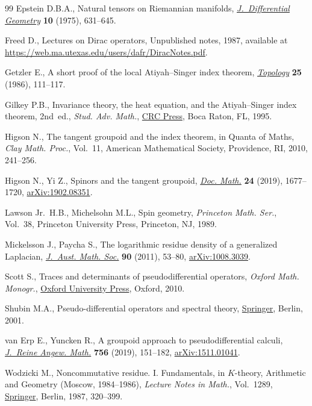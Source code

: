 \documentclass[pdftex]{sigma}
\numberwithin{equation}{section}
\theoremstyle{definition}
\begin{document}
\begin{thebibliography}{99}
Epstein D.B.A., Natural tensors on {R}iemannian manifolds,
 \href{https://doi.org/10.4310/jdg/1214433166}{\textit{J.~Differential Geometry}} \textbf{10} (1975), 631--645.

Freed D., Lectures on Dirac operators, {U}npublished notes, 1987, available at
 \url{https://web.ma.utexas.edu/users/dafr/DiracNotes.pdf}.

Getzler E., A short proof of the local {A}tiyah--{S}inger index theorem,
 \href{https://doi.org/10.1016/0040-9383(86)90008-X}{\textit{Topology}} \textbf{25} (1986), 111--117.

Gilkey P.B., Invariance theory, the heat equation, and the {A}tiyah--{S}inger
 index theorem, 2nd~ed., \textit{Stud. Adv. Math.}, \href{https://doi.org/10.1201/9780203749791}{CRC Press}, Boca Raton, FL, 1995.

Higson N., The tangent groupoid and the index theorem, in Quanta of Maths,
 \textit{Clay Math. Proc.}, Vol.~11, American Mathematical Society,
 Providence, RI, 2010, 241--256.

Higson N., Yi Z., Spinors and the tangent groupoid, \href{https://doi.org/10.4171/DM/712}{\textit{Doc. Math.}}
 \textbf{24} (2019), 1677--1720, \href{https://arxiv.org/abs/1902.08351}{arXiv:1902.08351}.

Lawson Jr.~H.B., Michelsohn M.L., Spin geometry, \textit{Princeton Math. Ser.},
 Vol.~38, Princeton University Press, Princeton, NJ, 1989.

Mickelsson J., Paycha S., The logarithmic residue density of a generalized
 {L}aplacian, \href{https://doi.org/10.1017/S144678871100108X}{\textit{J.~Aust. Math. Soc.}} \textbf{90} (2011), 53--80,
 \href{https://arxiv.org/abs/1008.3039}{arXiv:1008.3039}.

Scott S., Traces and determinants of pseudodifferential operators, \textit{Oxford Math.
 Monogr.}, \href{https://doi.org/10.1093/acprof:oso/9780198568360.001.0001}{Oxford University Press}, Oxford, 2010.

Shubin M.A., Pseudo-differential operators and spectral theory, \href{https://doi.org/10.1007/978-3-642-56579-3}{Springer},
 Berlin, 2001.

van Erp E., Yuncken R., A groupoid approach to pseudodifferential calculi,
 \href{https://doi.org/10.1515/crelle-2017-0035}{\textit{J.~Reine Angew. Math.}} \textbf{756} (2019), 151--182,
 \href{https://arxiv.org/abs/1511.01041}{arXiv:1511.01041}.

Wodzicki M., Noncommutative residue. {I}. {F}undamentals, in {$K$}-theory,
 Arithmetic and Geometry ({M}oscow, 1984--1986), \textit{Lecture Notes in
 Math.}, Vol.~1289, \href{https://doi.org/10.1007/BFb0078372}{Springer}, Berlin, 1987, 320--399.

\end{thebibliography}\LastPageEnding
\end{document}
